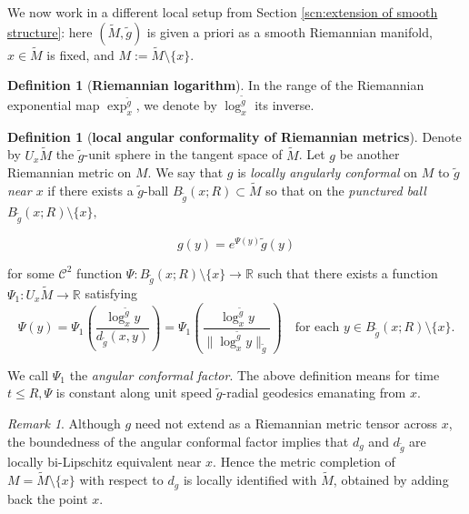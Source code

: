 \documentclass{amsart}
\theoremstyle{definition}
\newtheorem{definition}[theorem]{Definition}
\theoremstyle{remark}
\newtheorem{remark}[theorem]{Remark}
\newcommand{\nd}{\noindent}
\newcommand{\cl}{\mathbb{R}}
\newcommand{\0}{\boldsymbol{0}}
\def\cC{\mathcal C}
\begin{document}
We now work in a different local setup from Section \ref{scn:extension of smooth structure}: here $(\widetilde M,\tilde g)$ is given a priori as a smooth Riemannian manifold, $x\in\widetilde M$ is fixed, and $M:=\widetilde M\setminus\{x\}$. 

\begin{definition}[\textbf{Riemannian logarithm}]\label{def:log-map}
In the range of the Riemannian exponential map $\exp_x^{\tilde g}$, we denote by $\log_x^{\tilde g}$ its inverse.
\end{definition}


\begin{definition}[\textbf{local angular conformality of Riemannian metrics}]\label{def:locally angularly conformal}
Denote by $U_x\widetilde{M}$ the $\tilde{g}$-unit sphere in the tangent space of $\widetilde{M}$. Let $g$ be another Riemannian metric on $M.$ We say that $g$ is \textit{locally angularly conformal} on $M$ to $\tilde{g}$ \textit{near $x$ }if there exists a $\tilde{g}$-ball $B_{\tilde{g}}(x;R)\subset \widetilde{M}$ so that on the \textit{punctured ball} $B_{\tilde{g}}(x;R)\setminus \{x\},$


\[g(y)=e^{\Psi(y)}\tilde{g}(y)\]

\nd for some $\cC^2$ function $\Psi:B_{\tilde g}(x;R)\setminus \{x\}\to \cl$ such that there exists a function $\Psi_1:U_x\widetilde M\to \cl$ satisfying
\[
\Psi(y)=\Psi_1\!\left(\frac{\log_x^{\tilde g} y}{d_{\tilde g}(x,y)} \right)
= \Psi_1\!\left(\frac{\log_x^{\tilde g} y}{\|\log_x^{\tilde g} y\|_{\tilde g}} \right)
\quad \text{for each } y\in B_{\tilde g}(x;R)\setminus \{x\}.
\]




\nd We call $\Psi_1$ the \textit{angular conformal factor}.
The above definition means for time $t\le R, \Psi$ is constant along unit speed $\tilde{g}$-radial geodesics emanating from $x$.
    
\end{definition}
\begin{remark}\label{rmk:same-completion}
  Although \(g\) need not extend as a Riemannian metric tensor across \(x\), the boundedness of the angular conformal factor implies that \(d_g\) and \(d_{\tilde g}\) are locally bi-Lipschitz equivalent near \(x\). Hence the metric completion of \(M=\widetilde M\setminus\{x\}\) with respect to \(d_g\) is locally identified with \(\widetilde M\), obtained by adding back the point \(x\).  
\end{remark}
\end{document}
